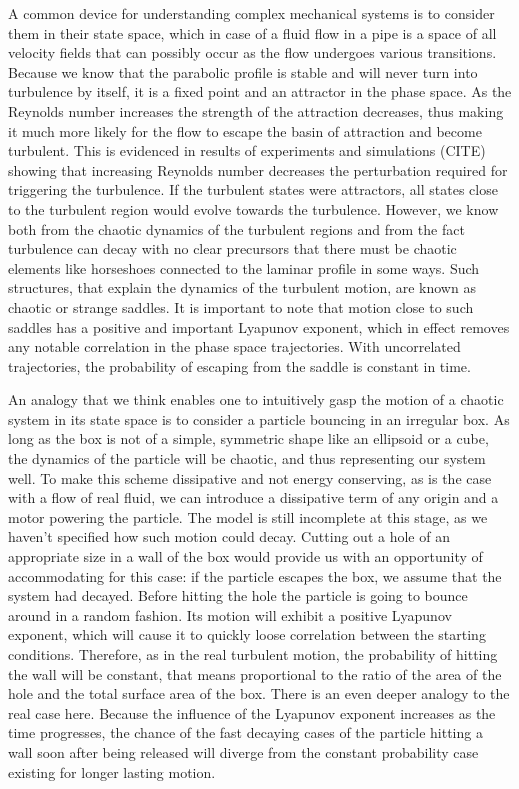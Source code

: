 \documentclass[11pt,a4paper]{article}
\begin{document}
A common device for understanding complex mechanical systems is to consider them in their state space, which in case of a fluid flow in a pipe\cite{Lanford82} is a space of all velocity fields that can possibly occur as the flow undergoes various transitions.
Because we know that the parabolic profile is stable\cite{Eckhardt07} and will never turn into turbulence by itself, it is a fixed point and an attractor in the phase space.
As the Reynolds number increases the strength of the attraction decreases, thus making it much more likely for the flow to escape the basin of attraction and become turbulent.
This is evidenced in results of experiments and simulations (CITE) showing that increasing Reynolds number decreases the perturbation required for triggering the turbulence.
If the turbulent states were attractors\cite{Guckenheimer86}\cite{Lanford82}, all states close to the turbulent region would evolve towards the turbulence.
However, we know both from the chaotic dynamics of the turbulent regions and from the fact turbulence can decay with no clear precursors that there must be chaotic elements\cite{Guckenheimer83} like horseshoes connected to the laminar profile in some ways.
Such structures, that explain the dynamics of the turbulent motion, are known as chaotic or strange saddles.
It is important to note that motion close to such saddles has a positive and important Lyapunov exponent, which in effect removes any notable correlation in the phase space trajectories.
With uncorrelated trajectories, the probability of escaping from the saddle is constant in time.

An analogy that we think enables one to intuitively gasp the motion of a chaotic system in its state space is to consider a particle bouncing in an irregular box\cite{Ott93}.
As long as the box is not of a simple, symmetric shape like an ellipsoid or a cube, the dynamics of the particle will be chaotic, and thus representing our system well\cite{Ott93}.
To make this scheme dissipative and not energy conserving, as is the case with a flow of real fluid, we can introduce a dissipative term of any origin and a motor powering the particle.
The model is still incomplete at this stage, as we haven't specified how such motion could decay.
Cutting out a hole of an appropriate size in a wall of the box would provide us with an opportunity of accommodating for this case: if the particle escapes the box, we assume that the system had decayed.
Before hitting the hole the particle is going to bounce around in a random fashion.
Its motion will exhibit a positive Lyapunov exponent, which will cause it to quickly loose correlation between the starting conditions.
Therefore, as in the real turbulent motion, the probability of hitting the wall will be constant, that means proportional to the ratio of the area of the hole and the total surface area of the box.
There is an even deeper analogy to the real case here.
Because the influence of the Lyapunov exponent increases as the time progresses, the chance of the fast decaying cases of the particle hitting a wall soon after being released will diverge from the constant probability case existing for longer lasting motion.
\end{document}
